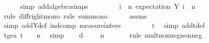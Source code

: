 \begin{isabellebody}
\ \ \ \ \isamarkupfalse%
\ {\isacharparenleft}{\kern0pt}simp\ add{\isacharcolon}{\kern0pt}algebra{\isacharunderscore}{\kern0pt}simps{\isacharparenright}{\kern0pt}\isanewline
\ \ \isamarkupfalse%
\ \isamarkupfalse%
\ {\isachardoublequoteopen}{\isachardot}{\kern0pt}{\isachardot}{\kern0pt}{\isachardot}{\kern0pt}\ {\isasymle}\ {\isacharparenleft}{\kern0pt}{\isasymSum}\ i\ {\isacharequal}{\kern0pt}\ {}{\isachardot}{\kern0pt}{\isachardot}{\kern0pt}{\isacharless}{\kern0pt}n{\isachardot}{\kern0pt}\ expectation\ {\isacharparenleft}{\kern0pt}Y\ i{\isacharparenright}{\kern0pt}{\isacharparenright}{\kern0pt}\ {\isacharminus}{\kern0pt}\ n{\isacharslash}{\kern0pt}{}{\isachardoublequoteclose}\isanewline
\ \ \ \ \isamarkupfalse%
\ {\isacharparenleft}{\kern0pt}rule\ diff{\isacharunderscore}{\kern0pt}right{\isacharunderscore}{\kern0pt}mono{\isacharcomma}{\kern0pt}\ rule\ sum{\isacharunderscore}{\kern0pt}mono{\isacharparenright}{\kern0pt}\isanewline
\ \ \ \ \isamarkupfalse%
\ assms{\isacharparenleft}{\kern0pt}{}{\isacharparenright}{\kern0pt}\ \isamarkupfalse%
\ {\isacharparenleft}{\kern0pt}simp\ add{\isacharcolon}{\kern0pt}Y{\isacharunderscore}{\kern0pt}def\ ind{\isacharunderscore}{\kern0pt}comp\ measure{\isacharunderscore}{\kern0pt}inters{\isacharparenright}{\kern0pt}\ \isanewline
\ \ \isamarkupfalse%
\ \isamarkupfalse%
\ {\isachardoublequoteopen}{\isachardot}{\kern0pt}{\isachardot}{\kern0pt}{\isachardot}{\kern0pt}\ {\isacharequal}{\kern0pt}\ t{\isachardoublequoteclose}\ \isamarkupfalse%
\ {\isacharparenleft}{\kern0pt}simp\ add{\isacharcolon}{\kern0pt}t{\isacharunderscore}{\kern0pt}def{\isacharparenright}{\kern0pt}\isanewline
\ \ \isamarkupfalse%
\ \isamarkupfalse%
\ t{\isacharunderscore}{\kern0pt}ge{\isacharunderscore}{\kern0pt}a{\isacharcolon}{\kern0pt}\ {\isachardoublequoteopen}t\ {\isasymge}\ {\isasymalpha}\ {\isacharasterisk}{\kern0pt}\ n{\isachardoublequoteclose}\ \isamarkupfalse%
\ simp\isanewline
\isanewline
\ \ \isamarkupfalse%
\ d{\isacharcolon}{\kern0pt}\ {\isachardoublequoteopen}{}\ {\isasymle}\ {\isasymalpha}\ {\isacharasterisk}{\kern0pt}\ n{\isachardoublequoteclose}\ \isanewline
\ \ \ \ \isamarkupfalse%
\ {\isacharparenleft}{\kern0pt}rule\ mult{\isacharunderscore}{\kern0pt}nonneg{\isacharunderscore}{\kern0pt}nonneg{\isacharparenright}{\kern0pt}\isanewline
\ \ \ \ \isamarkupfalse%

\end{isabellebody}
